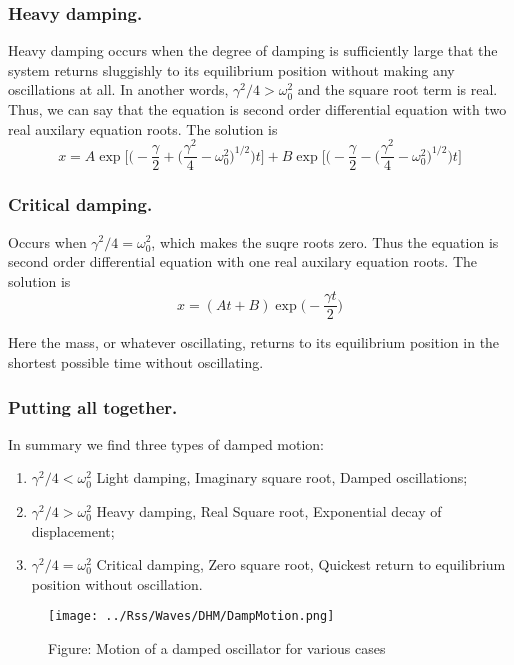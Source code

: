 \documentclass[../main.tex]{subfiles}
\begin{document}
\subsubsection*{Heavy damping.} Heavy damping occurs when the degree of damping is sufficiently large that the system returns sluggishly to its equilibrium position without making any oscillations at all. In another words, $\gamma^2/4 > \omega_0^2$ and the square root term is real. Thus, we can say that the equation is second order differential equation with two real auxilary equation roots. The solution is
\begin{equation*}
    x=A\exp \biggl[\bigg(-\frac{\gamma}{2} + \big(\frac{\gamma^2}{4}-\omega_0^2\big)^{1/2}\bigg)t\biggr] +B \exp \biggl[\bigg(-\frac{\gamma}{2} - \big(\frac{\gamma^2}{4}-\omega_0^2\big)^{1/2}\bigg)t\biggr]
\end{equation*}

\subsubsection*{Critical damping.} Occurs when $\gamma^2/4 = \omega_0^2$, which makes the suqre roots zero. Thus the equation is second order differential equation with one real auxilary equation roots. The solution is
\begin{equation*}
    x=(At+B)\exp\biggl(-\frac{\gamma t}{2}\biggr)
\end{equation*}

Here the mass, or whatever oscillating, returns to its equilibrium position in the shortest possible time without oscillating. 

\subsubsection*{Putting all together.} In summary we find three types of damped motion:
\begin{enumerate}
    \item $\gamma^2/4<\omega_0^2$ Light damping, Imaginary square root, Damped oscillations;
    \item $\gamma^2/4>\omega_0^2$ Heavy damping, Real Square root, Exponential decay of displacement;
    \item $\gamma^2/4=\omega_0^2$ Critical damping, Zero square root, Quickest return to equilibrium position without oscillation.
\end{enumerate} 
\begin{figure*}[h]
    \centering
    \texttt{[image: ../Rss/Waves/DHM/DampMotion.png]}
    \caption*{Figure: Motion of a damped oscillator for various cases}
\end{figure*}
\end{document}
